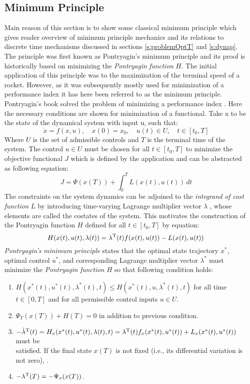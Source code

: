 \subsection{Minimum Principle} 
\noindent Main reason of this section is to show some classical minimum principle which gives reader overview of minimum principle mechanics and its relations to discrete time mechanisms discussed in sections \ref{s:problemOptT} and \ref{s:dynap}.
The principle was first known as Pontryagin's minimum principle and its proof is historically based on minimizing the \textit{Pontryagin function} $H$. The initial application of this principle was to the maximization of the terminal speed of a rocket. However, as it was subsequently mostly used for minimization of a performance index it has here been referred to as the minimum principle. Pontryagin's book solved the problem of minimizing a performance index \cite{pontryagin1962matematicheskaya}.
\noindent
Here the necessary conditions are shown for minimization of a functional. Take x to be the state of the dynamical system with input u, such that:
\begin{equation}
    \dot {x}=f(x,u),\quad x(0)=x_{0},\quad u(t)\in U,\quad t\in [t_0,T]
\end{equation}
Where $U$ is the set of admissible controls and $T$ is the terminal  time of the system. The control $u\in U$ must be chosen for all $t\in [t_0,T]$ to minimize the objective functional $J$ which is defined by the application and can be abstracted as following equation:
\begin{equation}
    J=\Psi (x(T))+\int _{0}^{T}L(x(t),u(t))\,dt
\end{equation}
The constraints on the system dynamics can be adjoined to the \textit{integrand of cost function} $L$ by introducing time-varying Lagrange multiplier vector $\lambda$ , whose elements are called the costates of the system. This motivates the construction of the Pontryagin function $H$ defined for all $t\in [t_0,T]$ by equation:
\begin{equation}
    {\displaystyle H(x(t),u(t),\lambda (t))=\lambda ^{\rm {T}}(t)f(x(t),u(t))-L(x(t),u(t))\,}
\end{equation}
\newpage\noindent \textit{Pontryagin's minimum principle} states that the optimal state trajectory $x^{*}$, optimal control $u^{*}$, and corresponding Lagrange multiplier vector $\lambda^*$ must minimize the \textit{Pontryagin function} $H$ so that following condition holds:
\begin{enumerate}
    \item $H(x^{*}(t),u^{*}(t),\lambda ^{*}(t),t)\leq H(x^{*}(t),u,\lambda ^{*}(t),t)$ for all time $t\in [0,T]$ and for all permissible control inputs $u \in U$.
    \item $\Psi _{T}(x(T))+H(T)=0$ in addition to previous condition.
    \item ${-{\dot {\lambda }}^{\rm {T}}(t)=H_{x}(x^{*}(t),u^{*}(t),\lambda (t),t)=\lambda ^{\rm {T}}(t)f_{x}(x^{*}(t),u^{*}(t))+L_{x}(x^{*}(t),u^{*}(t))}$ must be\\ satisfied. If the final state $x(T)$ is not fixed (i.e., its differential variation is not zero), .
    \item ${-\lambda ^{\rm {T}}(T)=-\Psi _{x}(x(T))}$.
\end{enumerate}
